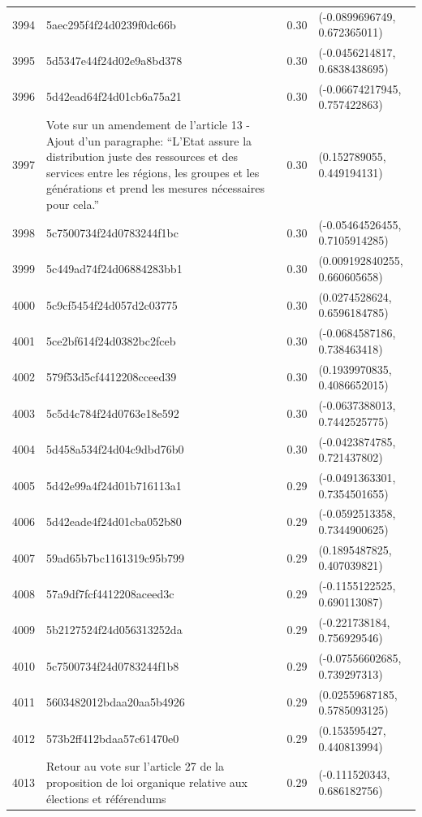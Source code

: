 \begin{table}[ht]
\begin{tabular}{rlrl}
  3994 & 5aec295f4f24d0239f0dc66b & 0.30 & (-0.0899696749, 0.672365011) \\ 
  3995 & 5d5347e44f24d02e9a8bd378 & 0.30 & (-0.0456214817, 0.6838438695) \\ 
  3996 & 5d42ead64f24d01cb6a75a21 & 0.30 & (-0.06674217945, 0.757422863) \\ 
  3997 & Vote sur un amendement de l'article 13 - Ajout d'un paragraphe: “L’Etat assure la distribution juste des ressources et des services entre les régions, les groupes et les générations et prend les mesures nécessaires pour cela.” & 0.30 & (0.152789055, 0.449194131) \\ 
  3998 & 5c7500734f24d0783244f1bc & 0.30 & (-0.05464526455, 0.7105914285) \\ 
  3999 & 5c449ad74f24d06884283bb1 & 0.30 & (0.009192840255, 0.660605658) \\ 
  4000 & 5c9cf5454f24d057d2c03775 & 0.30 & (0.0274528624, 0.6596184785) \\ 
  4001 & 5ce2bf614f24d0382bc2fceb & 0.30 & (-0.0684587186, 0.738463418) \\ 
  4002 & 579f53d5cf4412208cceed39 & 0.30 & (0.1939970835, 0.4086652015) \\ 
  4003 & 5c5d4c784f24d0763e18e592 & 0.30 & (-0.0637388013, 0.7442525775) \\ 
  4004 & 5d458a534f24d04c9dbd76b0 & 0.30 & (-0.0423874785, 0.721437802) \\ 
  4005 & 5d42e99a4f24d01b716113a1 & 0.29 & (-0.0491363301, 0.7354501655) \\ 
  4006 & 5d42eade4f24d01cba052b80 & 0.29 & (-0.0592513358, 0.7344900625) \\ 
  4007 & 59ad65b7bc1161319c95b799 & 0.29 & (0.1895487825, 0.407039821) \\ 
  4008 & 57a9df7fcf4412208aceed3c & 0.29 & (-0.1155122525, 0.690113087) \\ 
  4009 & 5b2127524f24d056313252da & 0.29 & (-0.221738184, 0.756929546) \\ 
  4010 & 5c7500734f24d0783244f1b8 & 0.29 & (-0.07556602685, 0.739297313) \\ 
  4011 & 5603482012bdaa20aa5b4926 & 0.29 & (0.02559687185, 0.5785093125) \\ 
  4012 & 573b2ff412bdaa57c61470e0 & 0.29 & (0.153595427, 0.440813994) \\ 
  4013 & Retour au vote sur l'article 27 de la proposition de loi organique relative aux élections et référendums & 0.29 & (-0.111520343, 0.686182756) \\ 

\end{tabular}
\end{table}
